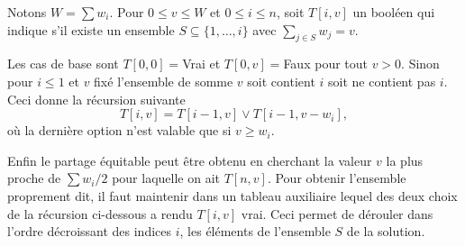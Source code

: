 \documentclass[12pt]{article}
\begin{document}
Notons $W=\sum w_i$.  Pour $0\leq v \leq W$ et $0 \leq i \leq n$, soit $T[i,v]$ un booléen qui indique s'il existe un ensemble $S\subseteq \{1, \ldots, i\}$ avec $\sum_{j\in S} w_j = v$.

Les cas de base sont $T[0,0]=$Vrai et $T[0,v]=$Faux pour tout $v>0$.
Sinon pour $i \leq 1$ et $v$ fixé l'ensemble de somme $v$ soit contient $i$ soit ne contient pas $i$.  Ceci donne la récursion suivante
\[
		T[i,v] = T[i-1, v] \vee T[i-1, v - w_i],
\]
où la dernière option n'est valable que si $v \geq w_i$.

Enfin le partage équitable peut être obtenu en cherchant la valeur $v$ la plus proche de $\sum w_i /2$ pour laquelle on ait $T[n,v]$.  Pour obtenir l'ensemble proprement dit, il faut maintenir dans un tableau auxiliaire lequel des deux choix de la récursion ci-dessous a rendu $T[i,v]$ vrai. Ceci permet de dérouler dans l'ordre décroissant des indices $i$, les éléments de l'ensemble $S$ de la solution.
\end{document}
